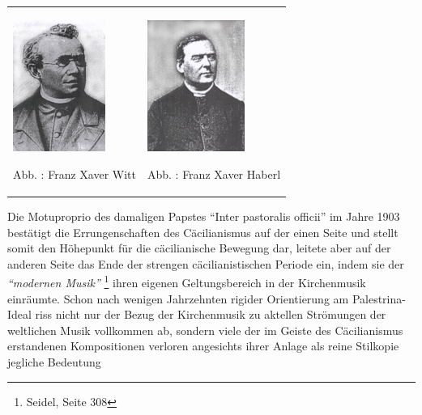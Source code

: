 \documentclass[a4paper]{article}
\newcommand\zitat[1]{\textit{#1}}
\newcounter{Abb}
\renewcommand\theAbb{\arabic{Abb}}
\begin{document}
\begin{center}
\begin{minipage}{6.943cm}
\begin{flushleft}
\tablefirsthead{}
\tablehead{}
\tabletail{}
\tablelasttail{}
\begin{supertabular}{m{3.197cm}m{3.345cm}}

\includegraphics[width=3.016cm,height=4.284cm]{pictures/zulassungsarbeit-img078.jpg}

Abb. \stepcounter{Abb}{\theAbb}: Franz Xaver Witt &

\includegraphics[width=3.163cm,height=4.3cm]{pictures/zulassungsarbeit-img079.jpg}

Abb. \stepcounter{Abb}{\theAbb}: Franz Xaver Haberl\\
\end{supertabular}
\end{flushleft}
\end{minipage}
\end{center}
Die Motuproprio des damaligen Papstes “Inter pastoralis officii” im
Jahre 1903 bestätigt die Errungenschaften des Cäcilianismus auf der
einen Seite und stellt somit den Höhepunkt für die cäcilianische
Bewegung dar, leitete aber auf der anderen Seite das Ende der strengen
cäcilianistischen Periode ein, indem sie der \zitat{“modernen
Musik” } \footnote{Seidel, Seite 308} ihren eigenen Geltungsbereich in
der Kirchenmusik einräumte. Schon nach wenigen Jahrzehnten rigider
Orientierung am Palestrina-Ideal riss nicht nur der Bezug der
Kirchenmusik zu aktellen Strömungen der weltlichen Musik vollkommen ab,
sondern viele der im Geiste des Cäcilianismus erstandenen Kompositionen
verloren angesichts ihrer Anlage als reine Stilkopie jegliche Bedeutung
\end{document}
